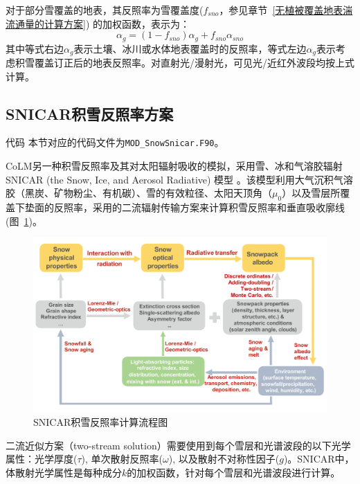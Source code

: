 对于部分雪覆盖的地表，其反照率为雪覆盖度($f_{sno}$，参见章节~\ref{无植被覆盖地表湍流通量的计算方案}) 的加权函数，表示为：
\begin{equation}
\alpha_{g}=\left(1-f_{sno}\right) \alpha_{g} + f_{sno} \alpha_{sno}
\end{equation}
其中等式右边$\alpha_{g}$表示土壤、冰川或水体地表覆盖时的反照率，等式左边$\alpha_{g}$表示考虑积雪覆盖订正后的地表反照率。对直射光/漫射光，可见光/近红外波段均按上式计算。

\subsection{SNICAR积雪反照率方案}\label{SNICAR积雪反照率}
\begin{mymdframed}{代码}
本节对应的代码文件为\texttt{MOD\_SnowSnicar.F90}。
\end{mymdframed}

CoLM另一种积雪反照率及其对太阳辐射吸收的模拟，采用雪、冰和气溶胶辐射SNICAR (the Snow, Ice, and Aerosol Radiative) 模型 \citep{flanner2021SNICARADv3CommunityTool}。该模型利用大气沉积气溶胶（黑炭、矿物粉尘、有机碳）、雪的有效粒径、太阳天顶角（\(\mu_{0}\)）以及雪层所覆盖下垫面的反照率，采用\citet{toon1989RapidCalculationRadiative}的二流辐射传输方案来计算积雪反照率和垂直吸收廓线(图~\ref{fig:SNICAR模型流程图})。

{
\begin{figure}[htbp]
\centering
\includegraphics[width=1\columnwidth]{Figures/辐射过程及辐射通量计算/SNICAR模型计算流程图.png}
\caption{SNICAR积雪反照率计算流程图\citep{he2020SnowAlbedoRadiative}}
\label{fig:SNICAR模型流程图}
\end{figure}
}

二流近似方案（two-stream
solution）需要使用到每个雪层和光谱波段的以下光学属性：光学厚度($\tau$),
单次散射反照率($\omega$),
以及散射不对称性因子($g$)。SNICAR中，体散射光学属性是每种成分$k$的加权函数，针对每个雪层和光谱波段进行计算。

